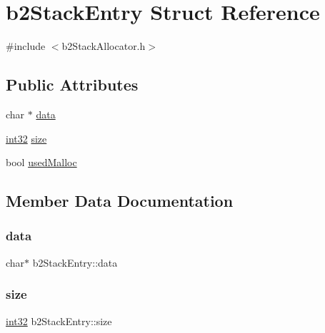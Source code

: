 \hypertarget{structb2_stack_entry}{}\section{b2\+Stack\+Entry Struct Reference}
\label{structb2_stack_entry}


{\ttfamily \#include $<$b2\+Stack\+Allocator.\+h$>$}

\subsection*{Public Attributes}
\begin{DoxyCompactItemize}
\item 
char $\ast$ \mbox{\hyperlink{structb2_stack_entry_af98aedeec2c20af0b7d3508a687ddd86}{data}}
\item 
\mbox{\hyperlink{b2_settings_8h_a43d43196463bde49cb067f5c20ab8481}{int32}} \mbox{\hyperlink{structb2_stack_entry_a910c62f05317f8906224b2569e0cb344}{size}}
\item 
bool \mbox{\hyperlink{structb2_stack_entry_a581b5e4699bb66a28ec0727497a4e478}{used\+Malloc}}
\end{DoxyCompactItemize}


\subsection{Member Data Documentation}
\mbox{\label{structb2_stack_entry_af98aedeec2c20af0b7d3508a687ddd86}} 
\subsubsection{\texorpdfstring{data}{data}}
{\footnotesize\ttfamily char$\ast$ b2\+Stack\+Entry\+::data}

\mbox{\label{structb2_stack_entry_a910c62f05317f8906224b2569e0cb344}} 
\subsubsection{\texorpdfstring{size}{size}}
{\footnotesize\ttfamily \mbox{\hyperlink{b2_settings_8h_a43d43196463bde49cb067f5c20ab8481}{int32}} b2\+Stack\+Entry\+::size}


